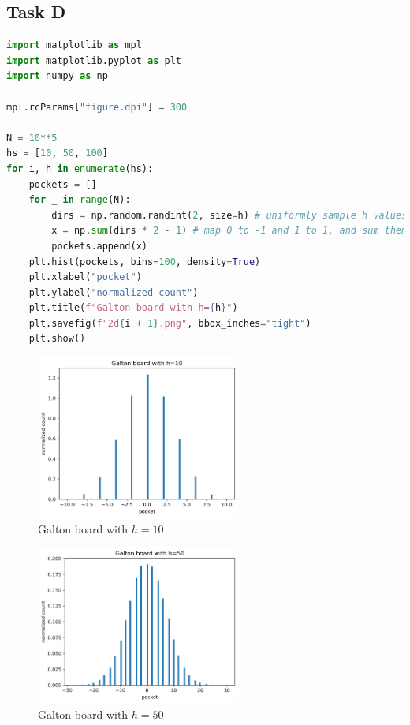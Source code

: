 \subsection*{Task D}
\begin{lstlisting}[language=Python, caption={Python code to implement Galton board and plot their histograms for $h=10,50,100$}, label=lst:galton]
import matplotlib as mpl
import matplotlib.pyplot as plt
import numpy as np

mpl.rcParams["figure.dpi"] = 300

N = 10**5
hs = [10, 50, 100]
for i, h in enumerate(hs):
    pockets = []
    for _ in range(N):
        dirs = np.random.randint(2, size=h) # uniformly sample h values from {0, 1}
        x = np.sum(dirs * 2 - 1) # map 0 to -1 and 1 to 1, and sum them to get final pocket
        pockets.append(x)
    plt.hist(pockets, bins=100, density=True)
    plt.xlabel("pocket")
    plt.ylabel("normalized count")
    plt.title(f"Galton board with h={h}")
    plt.savefig(f"2d{i + 1}.png", bbox_inches="tight")
    plt.show()
\end{lstlisting}
\begin{figure}[H]
	\centering
	\includegraphics[width=0.6\textwidth]{images/2d1.png}
	\caption{Galton board with $h=10$}
\end{figure}
\begin{figure}[H]
	\centering
	\includegraphics[width=0.6\textwidth]{images/2d2.png}
	\caption{Galton board with $h=50$}
\end{figure}
